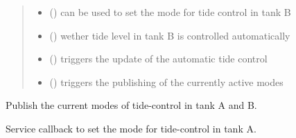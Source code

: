 \documentclass[a4paper,12pt,english]{article}
\begin{document}
\begin{fulllineitems}
\begin{quote}
\begin{description}
\begin{itemize}
\item {} 
 () \textendash{} can be used to set the mode for tide control in tank B

\item {} 
 () \textendash{} wether tide level in tank B is controlled automatically

\item {} 
 () \textendash{} triggers the update of the automatic tide control

\item {} 
 () \textendash{} triggers the publishing of the currently active modes

\end{itemize}

\end{description}\end{quote}

\begin{fulllineitems}
\label{\detokenize{meso_control_pkg:meso_control_pkg.tide_sim.TideSim.publish_mode}}
Publish the current modes of tide-control in tank A and B.

\end{fulllineitems}


\begin{fulllineitems}
\label{\detokenize{meso_control_pkg:meso_control_pkg.tide_sim.TideSim.set_auto_tide_a}}
Service callback to set the mode for tide-control in tank A.


\end{fulllineitems}
\end{fulllineitems}
\end{document}
